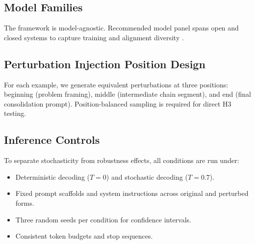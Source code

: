 \documentclass[conference]{IEEEtran}
\begin{document}
\subsection{Model Families}
The framework is model-agnostic. Recommended model panel spans open and closed systems to capture training and alignment diversity \cite{openai2023gpt4,anthropic2024claude,gemini2024,llama32024,qwen22024,guo2025deepseekr1}.

\begin{table}[!t]
\caption{Representative Model Panel for Evaluation}
\label{tab:model-panel}
\centering
{}
\end{table}

\subsection{Perturbation Injection Position Design}
For each example, we generate equivalent perturbations at three positions: beginning (problem framing), middle (intermediate chain segment), and end (final consolidation prompt). Position-balanced sampling is required for direct H3 testing.

\subsection{Inference Controls}
To separate stochasticity from robustness effects, all conditions are run under:
\begin{itemize}[leftmargin=*]
\item Deterministic decoding ($T=0$) and stochastic decoding ($T=0.7$).
\item Fixed prompt scaffolds and system instructions across original and perturbed forms.
\item Three random seeds per condition for confidence intervals.
\item Consistent token budgets and stop sequences.
\end{itemize}
\end{document}
